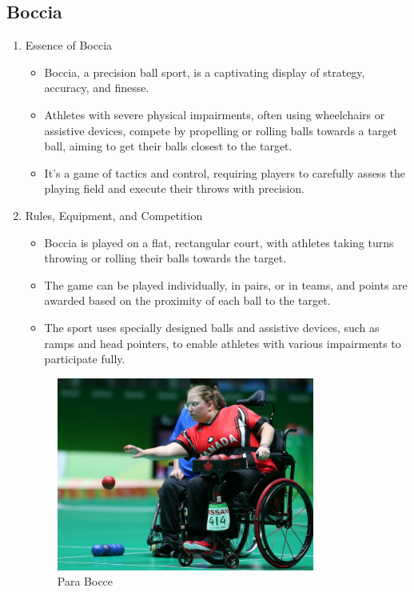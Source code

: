 \subsection{Boccia}

\begin{enumerate}

\item Essence of Boccia
    \begin{itemize}
    \item Boccia, a precision ball sport, is a captivating display of strategy, accuracy, and finesse.
    \item Athletes with severe physical impairments, often using wheelchairs or assistive devices, compete by propelling or rolling balls towards a target ball, aiming to get their balls closest to the target.
    \item It's a game of tactics and control, requiring players to carefully assess the playing field and execute their throws with precision. 
    \end{itemize}

\item Rules, Equipment, and Competition
    \begin{itemize}
    \item Boccia is played on a flat, rectangular court, with athletes taking turns throwing or rolling their balls towards the target. 
    \item The game can be played individually, in pairs, or in teams, and points are awarded based on the proximity of each ball to the target. 
    \item The sport uses specially designed balls and assistive devices, such as ramps and head pointers, to enable athletes with various impairments to participate fully.
    \end{itemize}

\begin{figure}[htbp] %
\centering
\includegraphics[width=0.8\textwidth]{Images/para_bocce.jpg}
\caption{Para Bocce}
\label{fig:my_image}
\end{figure}


\end{enumerate}
